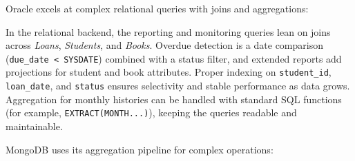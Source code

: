\documentclass[12pt,a4paper]{article}
\begin{document}
Oracle excels at complex relational queries with joins and aggregations:
\begin{comment}
\begin{lstlisting}[language=Java, caption=Oracle Complex Query Implementation]
// Finding overdue loans with student and book details (requires joins)
public List<OverdueLoanReport> getOverdueLoansWithDetails() throws SQLException {
    String sql = """
        SELECT l.loan_id, l.loan_date, l.due_date, l.renewal_count,
               s.name as student_name, s.email as student_email,
               b.title as book_title, b.author as book_author
        FROM Loans l
        JOIN Students s ON l.student_id = s.student_id
        JOIN Books b ON l.book_id = b.book_id
        WHERE l.status = 'ACTIVE' AND l.due_date < SYSDATE
        ORDER BY l.due_date ASC
        """;
    // Execute and map results...
}
\end{lstlisting}
\end{comment}

In the relational backend, the reporting and monitoring queries lean on joins across \textit{Loans}, \textit{Students}, and \textit{Books}. Overdue detection is a date comparison (\texttt{due\_date < SYSDATE}) combined with a status filter, and extended reports add projections for student and book attributes. Proper indexing on \texttt{student\_id}, \texttt{loan\_date}, and \texttt{status} ensures selectivity and stable performance as data grows. Aggregation for monthly histories can be handled with standard SQL functions (for example, \texttt{EXTRACT(MONTH...)}), keeping the queries readable and maintainable.

MongoDB uses its aggregation pipeline for complex operations:
\begin{comment}
\begin{lstlisting}[language=Java, caption=MongoDB Aggregation Pipeline]
// Finding overdue loans (requires separate queries or aggregation)
@Override
public List<Loan> getOverdueLoans() {
    LocalDate today = LocalDate.now();
    return findLoans(Filters.and(
        Filters.eq("status", "ACTIVE"),
        Filters.lt("due_date", formatDate(today))));
}

// For detailed reports, multiple queries or aggregation pipeline needed
public List<Document> getOverdueLoansWithDetails() {
    List<Bson> pipeline = Arrays.asList(
        Aggregates.match(Filters.and(
            Filters.eq("status", "ACTIVE"),
            Filters.lt("due_date", formatDate(LocalDate.now())))),
        Aggregates.lookup("students", "student_id", "student_id", "student_info"),
        Aggregates.lookup("books", "book_id", "book_id", "book_info")
    );
    return loans.aggregate(pipeline).into(new ArrayList<>());
}
\end{lstlisting}
\end{comment}
\end{document}
